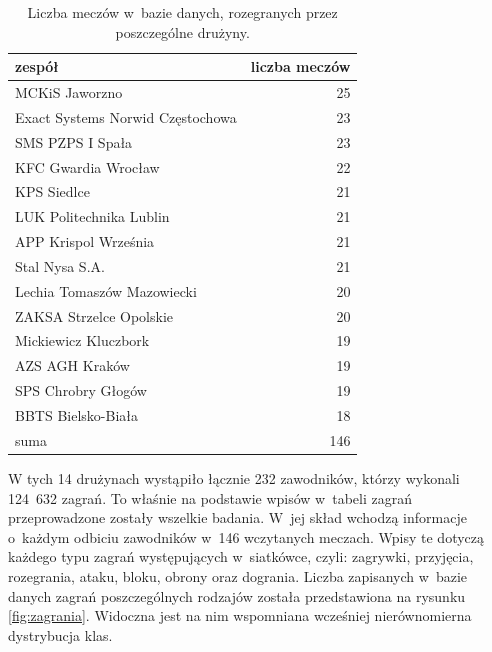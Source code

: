 \documentclass[a4paper,twoside,12pt]{book}
\begin{document}
\begin{table}
\centering
\caption{Liczba meczów w~bazie danych, rozegranych przez poszczególne drużyny.}
\label{tab:liczbaMeczow}
\begin{tabular}{lr}
	\toprule
	zespół                           & liczba meczów \\
	\midrule
	MCKiS Jaworzno                   &            25 \\
	Exact Systems Norwid Częstochowa &            23 \\
	SMS PZPS I Spała                 &            23 \\
	KFC Gwardia Wrocław              &            22 \\
	KPS Siedlce                      &            21 \\
	LUK Politechnika Lublin          &            21 \\
	APP Krispol Września             &            21 \\
	Stal Nysa S.A.                   &            21 \\
	Lechia Tomaszów Mazowiecki       &            20 \\
	ZAKSA Strzelce Opolskie          &            20 \\
	Mickiewicz Kluczbork             &            19 \\
	AZS AGH Kraków                   &            19 \\
	SPS Chrobry Głogów               &            19 \\
	BBTS Bielsko-Biała               &            18 \\
	\midrule
	suma                             &           146 \\
	\bottomrule
\end{tabular}
\end{table}

W tych 14 drużynach wystąpiło łącznie 232 zawodników, którzy wykonali 124~632 zagrań. To właśnie na podstawie wpisów w~tabeli zagrań przeprowadzone zostały wszelkie badania. W~jej skład wchodzą informacje o~każdym odbiciu zawodników w~146 wczytanych meczach. Wpisy te dotyczą każdego typu zagrań występujących w~siatkówce, czyli: zagrywki, przyjęcia, rozegrania, ataku, bloku, obrony oraz dogrania. Liczba zapisanych w~bazie danych zagrań poszczególnych rodzajów została przedstawiona na rysunku \ref{fig:zagrania}. Widoczna jest na nim wspomniana wcześniej nierównomierna dystrybucja klas.
\end{document}
